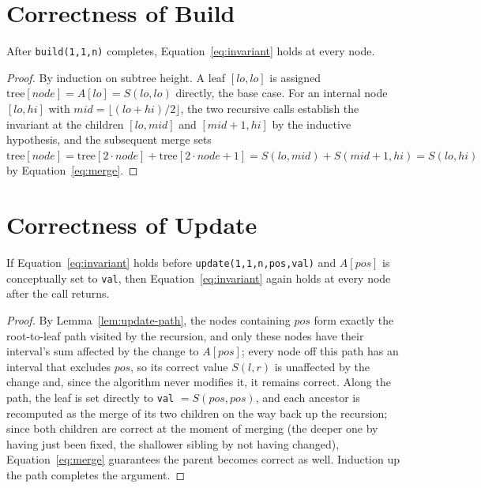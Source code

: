 \section{Correctness of Build}
\begin{thm}\label{thm:build-correct}
After \texttt{build(1,1,n)} completes, Equation~\eqref{eq:invariant} holds at every node.
\end{thm}
\begin{proof}
By induction on subtree height. A leaf $[lo,lo]$ is assigned $\text{tree}[node]=A[lo]=S(lo,lo)$ directly, the base case. For an internal node $[lo,hi]$ with $mid=\lfloor(lo+hi)/2\rfloor$, the two recursive calls establish the invariant at the children $[lo,mid]$ and $[mid+1,hi]$ by the inductive hypothesis, and the subsequent merge sets $\text{tree}[node]=\text{tree}[2\cdot node]+\text{tree}[2\cdot node+1]=S(lo,mid)+S(mid+1,hi)=S(lo,hi)$ by Equation~\eqref{eq:merge}.
\end{proof}

\section{Correctness of Update}
\begin{thm}\label{thm:update-correct}
If Equation~\eqref{eq:invariant} holds before \texttt{update(1,1,n,pos,val)} and $A[pos]$ is conceptually set to \texttt{val}, then Equation~\eqref{eq:invariant} again holds at every node after the call returns.
\end{thm}
\begin{proof}
By Lemma~\ref{lem:update-path}, the nodes containing $pos$ form exactly the root-to-leaf path visited by the recursion, and only these nodes have their interval's sum affected by the change to $A[pos]$; every node off this path has an interval that excludes $pos$, so its correct value $S(l,r)$ is unaffected by the change and, since the algorithm never modifies it, it remains correct. Along the path, the leaf is set directly to \texttt{val} $=S(pos,pos)$, and each ancestor is recomputed as the merge of its two children on the way back up the recursion; since both children are correct at the moment of merging (the deeper one by having just been fixed, the shallower sibling by not having changed), Equation~\eqref{eq:merge} guarantees the parent becomes correct as well. Induction up the path completes the argument.
\end{proof}

